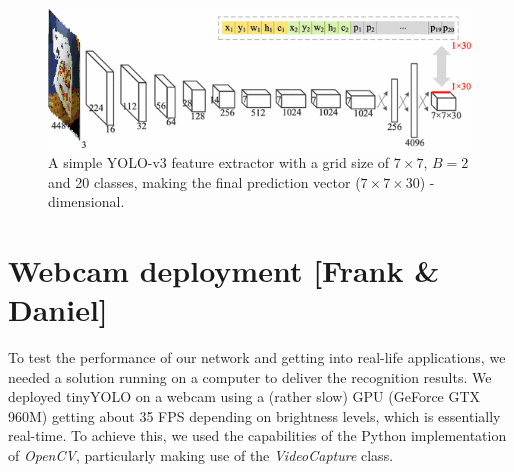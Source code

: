 \documentclass[a4paper]{article}
\begin{document}
\begin{figure}[h]
\includegraphics[width=1\linewidth]{images/tinyyolo}
\caption{A simple YOLO-v3 feature extractor with a grid size of $7\times 7$, $B=2$ and 20 classes, making the final prediction vector ($7 \times 7 \times 30$) - dimensional. }
\end{figure}
\newpage


\section{Webcam deployment [Frank \& Daniel]}
To test the performance of our network and getting into real-life applications, we needed a solution running on a computer to deliver the recognition results. We deployed tinyYOLO on a webcam using a (rather slow) GPU (GeForce GTX 960M) getting about 35 FPS depending on brightness levels, which is essentially real-time. To achieve this, we used the capabilities of the Python implementation of \textit{OpenCV}, particularly making use of the \textit{VideoCapture} class.
\end{document}
